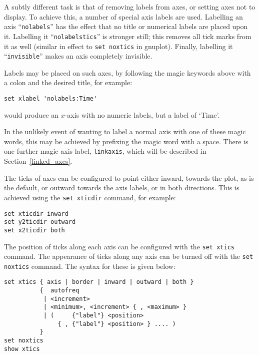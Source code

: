 \documentclass[a4paper,onecolumn,11pt]{book}
\begin{document}
A subtly different task is that of removing labels from axes, or setting axes
not to display. To achieve this, a number of special axis labels are used.
Labelling an axis ``\texttt{nolabels}'' has the effect that no title or numerical
labels are placed upon it. Labelling it\label{nolabelstics}
``\texttt{nolabelstics}'' is stronger still; this removes all tick marks from it as well
(similar in effect to \texttt{set noxtics} in gnuplot). Finally, labelling it
``\texttt{invisible}''
makes an axis completely invisible.

Labels may be placed on such axes, by following the magic keywords above with a
colon and the desired title, for example:

\begin{verbatim}
set xlabel 'nolabels:Time'
\end{verbatim}

\noindent would produce an $x$-axis with no numeric labels, but a label of
`Time'.

In the unlikely event of wanting
to label a normal axis with one of these magic words, this may be achieved by prefixing the magic
word with a space. There is one further magic axis label, \texttt{linkaxis},
which will be described in Section~\ref{linked_axes}.

The ticks of axes can be configured to point either inward, towards the plot,
as is the default, or outward towards the axis labels, or in both directions.
This is achieved using the \texttt{set xticdir} command, for example:

\begin{verbatim}
set xticdir inward
set y2ticdir outward
set x2ticdir both
\end{verbatim}

The position of ticks along each axis can be configured with the \texttt{set
xtics} command. The
appearance of ticks along any axis can be turned off with the \texttt{set
noxtics} command. The
syntax for these is given below:

\begin{verbatim}
set xtics { axis | border | inward | outward | both }
          {  autofreq
           | <increment>
           | <minimum>, <increment> { , <maximum> }
           | (     {"label"} <position>
               { , {"label"} <position> } .... )
          }
set noxtics
show xtics
\end{verbatim}
\end{document}
